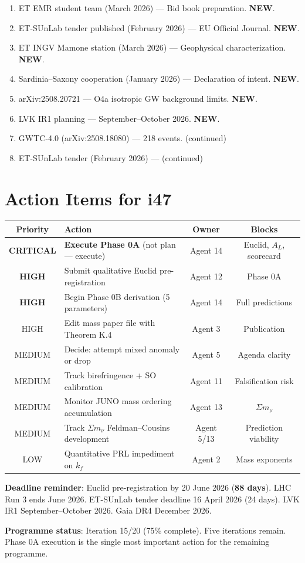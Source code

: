 \documentclass[11pt,a4paper]{article}
\newcommand{\NEW}{\textcolor{dfdblue}{\textbf{NEW}}}
\begin{document}
\begin{enumerate}
\item ET EMR student team (March 2026) --- Bid book preparation. \NEW.
\item ET-SUnLab tender published (February 2026) --- EU Official Journal. \NEW.
\item ET INGV Mamone station (March 2026) --- Geophysical characterization. \NEW.
\item Sardinia--Saxony cooperation (January 2026) --- Declaration of intent. \NEW.
\item arXiv:2508.20721 --- O4a isotropic GW background limits. \NEW.
\item LVK IR1 planning --- September--October 2026. \NEW.
\item GWTC-4.0 (arXiv:2508.18080) --- 218 events. (continued)
\item ET-SUnLab tender (February 2026) --- (continued)
\end{enumerate}


\part{Action Items for i47}

\begin{center}
\begin{tabular}{clcc}
\toprule
\textbf{Priority} & \textbf{Action} & \textbf{Owner} & \textbf{Blocks} \\
\midrule
\textbf{CRITICAL} & \textbf{Execute Phase 0A} (not plan --- execute) & Agent 14 & Euclid, $A_L$, scorecard \\
\textbf{HIGH} & Submit qualitative Euclid pre-registration & Agent 12 & Phase 0A \\
\textbf{HIGH} & Begin Phase 0B derivation (5 parameters) & Agent 14 & Full predictions \\
HIGH & Edit mass paper file with Theorem K.4 & Agent 3 & Publication \\
MEDIUM & Decide: attempt mixed anomaly or drop & Agent 5 & Agenda clarity \\
MEDIUM & Track birefringence + SO calibration & Agent 11 & Falsification risk \\
MEDIUM & Monitor JUNO mass ordering accumulation & Agent 13 & $\Sigma m_\nu$ \\
MEDIUM & Track $\Sigma m_\nu$ Feldman--Cousins development & Agent 5/13 & Prediction viability \\
LOW & Quantitative PRL impediment on $k_f$ & Agent 2 & Mass exponents \\
\bottomrule
\end{tabular}
\end{center}

\textbf{Deadline reminder}: Euclid pre-registration by 20 June 2026 (\textbf{88 days}). LHC Run 3 ends June 2026. ET-SUnLab tender deadline 16 April 2026 (24 days). LVK IR1 September--October 2026. Gaia DR4 December 2026.

\textbf{Programme status}: Iteration 15/20 (75\% complete). Five iterations remain. Phase 0A execution is the single most important action for the remaining programme.
\end{document}
